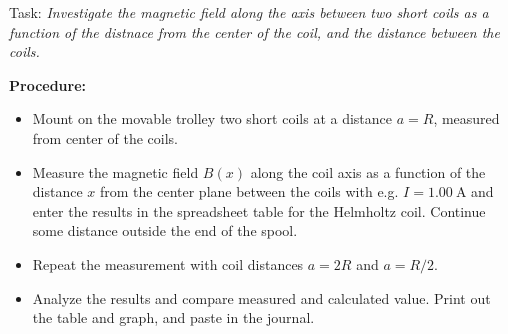 \documentclass[../Elmag-labhefte-2020.tex]{subfiles}
\begin{document}
Task:
\emph{Investigate the magnetic field along the axis between two short coils as a function of the distnace from the center of the coil, and the distance between the coils.}
 
\textbf{Procedure:}
\begin{itemize}
    \item Mount on the movable trolley two short coils at a distance $a = R$, measured from center of the coils.
    \item Measure the magnetic field $B(x)$ along the coil axis as a function of the distance $x$ from the center plane between the coils with e.g. $I = \SI{1.00}{\ampere}$ and enter the results in the spreadsheet table for the Helmholtz coil. Continue some distance outside the end of the spool.
    \item Repeat the measurement with coil distances $a = 2R$ and $a = R/2$.
    \item Analyze the results and compare measured and calculated value. Print out the table and graph, and paste in the journal.
\end{itemize}
\end{document}
